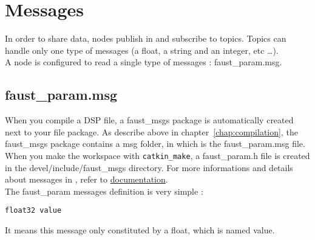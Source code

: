 \chapter{\faust Messages}
\label{chap:msgs}

In order to share data, \ros nodes publish in and subscribe to topics. Topics can handle only one type of messages (a float, a string and an integer, etc \dots).\\
A \faust node is configured to read a single type of messages : faust\_param.msg.

\section{faust\_param.msg}
When you compile a DSP file, a faust\_msgs package is automatically created next to your file package. As describe above in chapter~\ref{chap:compilation}, the faust\_msgs package contains a msg folder, in which is the faust\_param.msg file. 
When you make the workspace with \lstinline'catkin_make', a faust\_param.h file is created in the devel/include/faust\_msgs directory. For more informations and details about messages in \ros, refer to \href{http://wiki.ros.org/msg}{\ros documentation}.\\
The faust\_param messages definition is very simple :
\begin{lstlisting}
float32 value
\end{lstlisting}
It means this message only constituted by a float, which is named value.
\newpage
